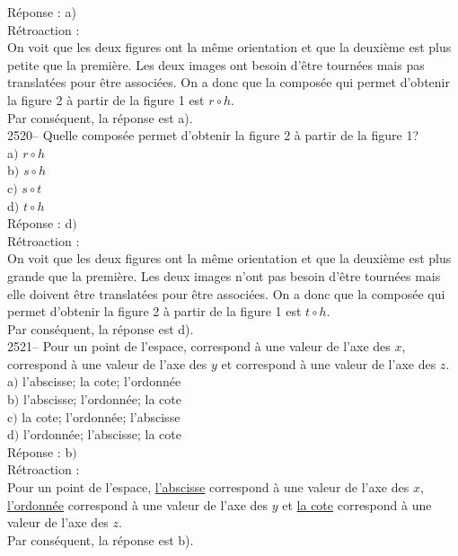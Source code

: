 \documentclass[letterpaper, 12pt]{article}
\begin{document}
R\'eponse : a)\\

R\'etroaction :\\
On voit que les deux figures ont la m\^eme orientation et que la deuxi\`eme est plus petite que la premi\`ere. Les deux images ont besoin d'\^etre tourn\'ees mais pas translat\'ees pour \^etre associ\'ees. On a donc que la compos\'ee qui permet d'obtenir la figure 2 \`a partir de la figure 1 est $r\circ h$.\\
Par cons\'equent, la r\'eponse est a).\\

2520-- Quelle compos\'ee permet d'obtenir la figure 2 \`a partir de la figure 1?\\

a$)$ $r\circ h$\\
b$)$ $s\circ h$\\
c$)$ $s\circ t$\\
d$)$ $t\circ h$\\

R\'eponse : d$)$\\

R\'etroaction :\\
On voit que les deux figures ont la m\^eme orientation et que la deuxi\`eme est plus grande que la premi\`ere. Les deux images n'ont pas besoin d'\^etre tourn\'ees mais elle doivent \^etre translat\'ees pour \^etre associ\'ees. On a donc que la compos\'ee qui permet d'obtenir la figure 2 \`a partir de la figure 1 est $t\circ h$.\\
Par cons\'equent, la r\'eponse est d).\\

2521-- Pour un point de l'espace, \underline{\qquad\qquad} correspond \`a une valeur de l'axe des $x$, \underline{\qquad\qquad} correspond \`a une valeur de l'axe des $y$ et \underline{\qquad\qquad} correspond \`a une valeur de l'axe des $z$. \\

a$)$ l'abscisse; la cote; l'ordonn\'ee\\
b$)$ l'abscisse; l'ordonn\'ee; la cote\\
c$)$ la cote; l'ordonn\'ee; l'abscisse\\
d$)$ l'ordonn\'ee; l'abscisse; la cote\\

R\'eponse : b$)$\\

R\'etroaction :\\
Pour un point de l'espace, \underline{l'abscisse} correspond \`a une valeur de l'axe des $x$, \underline{l'ordonn\'ee} correspond \`a une valeur de l'axe des $y$ et \underline{la cote} correspond \`a une valeur de l'axe des $z$.\\
Par cons\'equent, la r\'eponse est b).\\
\end{document}
